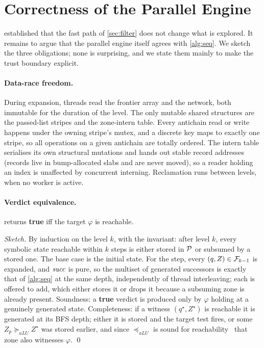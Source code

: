 \section{Correctness of the Parallel Engine}\label{sec:correctness}

 established that the fast path of \cref{sec:filter} does
not change what is explored.  It remains to argue that the parallel engine
itself agrees with \cref{alg:seq}.  We sketch the three obligations; none is
surprising, and we state them mainly to make the trust boundary explicit.

\paragraph{Data-race freedom.}
During expansion, threads read the frontier array and the network, both
immutable for the duration of the level.  The only mutable shared structures are
the passed-list stripes and the zone-intern table.  Every antichain read or
write happens under the owning stripe's mutex, and a discrete key maps to exactly
one stripe, so all operations on a given antichain are totally ordered.  The
intern table serialises its own structural mutations and hands out stable record
addresses (records live in bump-allocated slabs and are never moved), so a reader
holding an index is unaffected by concurrent interning.  Reclamation runs between
levels, when no worker is active.

\paragraph{Verdict equivalence.}
\begin{theorem}[Correctness]\label{thm:correct}
 returns \textbf{true} iff the target $\varphi$ is reachable.
\end{theorem}
\begin{proof}[Sketch]
By induction on the level $k$, with the invariant: after level $k$, every
symbolic state reachable within $k$ steps is either stored in $\mathcal{P}$ or
subsumed by a stored one.  The base case is the initial state.  For the step,
every $(q,Z) \in \mathcal{F}_{k-1}$ is expanded, and $\mathit{succ}$ is pure, so the
multiset of generated successors is exactly that of \cref{alg:seq} at the same
depth, independently of thread interleaving; each is offered to $\mathrm{add}$,
which either stores it or drops it because a subsuming zone is already present.
Soundness: a \textbf{true} verdict is produced only by $\varphi$ holding at a
genuinely generated state.  Completeness: if a witness $(q^\star,Z^\star)$ is
reachable it is generated at its BFS depth; either it is stored and the target
test fires, or some $Z_p \succeq_{aLU} Z^\star$ was stored earlier, and since
$\preceq_{aLU}$ is sound for reachability~\cite{Herbreteau12} that zone also
witnesses $\varphi$. \qed
\end{proof}

